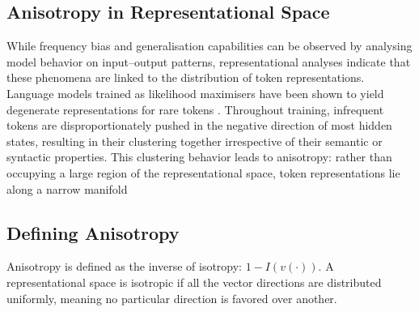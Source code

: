 
\subsection{Anisotropy in Representational Space}
While frequency bias and generalisation capabilities can be observed by analysing model behavior on input--output patterns, representational analyses indicate that these phenomena are linked to the distribution of token representations. Language models trained as likelihood maximisers have been shown to yield degenerate representations for rare tokens \citep{gao2018representation}. Throughout training, infrequent tokens are disproportionately pushed in the negative direction of most hidden states, resulting in their clustering together irrespective of their semantic or syntactic properties. This clustering behavior leads to anisotropy: rather than occupying a large region of the representational space, token representations lie along a narrow manifold \citep{gao2018representation, ethayarajh2019contextual}

\subsection{Defining Anisotropy}

Anisotropy is defined as the inverse of isotropy: $1-I(v(\cdot))$. A representational space is isotropic if all the vector directions are distributed uniformly, meaning no particular direction is favored over another.

